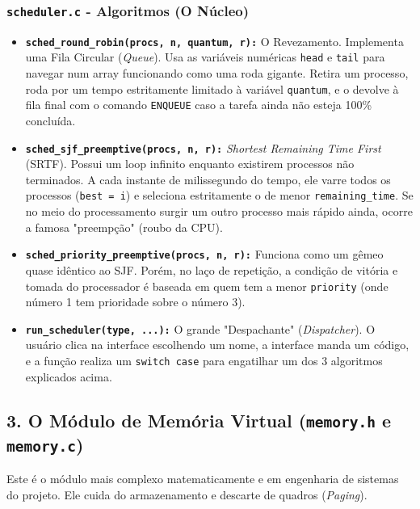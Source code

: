 \documentclass[12pt,a4paper]{article}
\begin{document}
\begin{itemize}
{\subsubsection{\texttt{scheduler.c} - Algoritmos (O Núcleo)}
\begin{itemize}
    \item \textbf{\texttt{sched\_round\_robin(procs, n, quantum, r):}} O Revezamento. Implementa uma Fila Circular (\textit{Queue}). Usa as variáveis numéricas \texttt{head} e \texttt{tail} para navegar num array funcionando como uma roda gigante. Retira um processo, roda por um tempo estritamente limitado à variável \texttt{quantum}, e o devolve à fila final com o comando \texttt{ENQUEUE} caso a tarefa ainda não esteja 100\% concluída.
    \item \textbf{\texttt{sched\_sjf\_preemptive(procs, n, r):}} \textit{Shortest Remaining Time First} (SRTF). Possui um loop infinito enquanto existirem processos não terminados. A cada instante de milissegundo do tempo, ele varre todos os processos (\texttt{best = i}) e seleciona estritamente o de menor \texttt{remaining\_time}. Se no meio do processamento surgir um outro processo mais rápido ainda, ocorre a famosa "preempção" (roubo da CPU).
    \item \textbf{\texttt{sched\_priority\_preemptive(procs, n, r):}} Funciona como um gêmeo quase idêntico ao SJF. Porém, no laço de repetição, a condição de vitória e tomada do processador é baseada em quem tem a menor \texttt{priority} (onde número 1 tem prioridade sobre o número 3).
    \item \textbf{\texttt{run\_scheduler(type, ...):}} O grande "Despachante" (\textit{Dispatcher}). O usuário clica na interface escolhendo um nome, a interface manda um código, e a função realiza um \texttt{switch case} para engatilhar um dos 3 algoritmos explicados acima.
\end{itemize}

\subsection{3. O Módulo de Memória Virtual (\texttt{memory.h} e \texttt{memory.c})}
Este é o módulo mais complexo matematicamente e em engenharia de sistemas do projeto. Ele cuida do armazenamento e descarte de quadros (\textit{Paging}).

}
\end{itemize}
\end{document}
